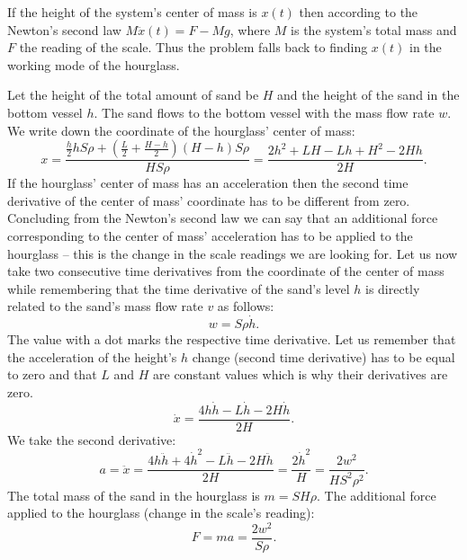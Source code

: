 {\ifEngHint
If the height of the system’s center of mass is $x(t)$ then according to the Newton’s second law $M\ddot{x}(t) = F - Mg$, where $M$ is the system’s total mass and $F$ the reading of the scale. Thus the problem falls back to finding $x(t)$ in the working mode of the hourglass.
\fi


\ifEngSolution
Let the height of the total amount of sand be $H$ and the height of the sand in the bottom vessel $h$. The sand flows to the bottom vessel with the mass flow rate $w$.\\
We write down the coordinate of the hourglass’ center of mass:
\[x=\frac{\frac{h}{2}hS\rho+(\frac{L}{2}+\frac{H-h}{2})(H-h)S\rho}{HS\rho}=\frac{2h^2+LH-Lh+H^2-2Hh}{2H}.\] 
If the hourglass’ center of mass has an acceleration then the second time derivative of the center of mass’ coordinate has to be different from zero. Concluding from the Newton’s second law we can say that an additional force corresponding to the center of mass’ acceleration has to be applied to the hourglass – this is the change in the scale readings we are looking for. Let us now take two consecutive time derivatives from the coordinate of the center of mass while remembering that the time derivative of the sand’s level $h$ is directly related to the sand’s mass flow rate $v$ as follows:
\[w=S\rho\dot{h}.\] 
The value with a dot marks the respective time derivative. Let us remember that the acceleration of the height’s $h$ change (second time derivative) has to be equal to zero and that $L$ and $H$ are constant values which is why their derivatives are zero.
\[\dot{x}=\frac{4h\dot{h}-L\dot{h}-2H\dot{h}}{2H}.\] 
We take the second derivative:
\[a=\ddot{x}=\frac{4h\ddot{h}+4\dot{h}^2-L\ddot{h}-2H\ddot{h}}{2H}=\frac{2\dot{h}^2}{H}=\frac{2w^2}{HS^2\rho^2}.\] 
The total mass of the sand in the hourglass is $m=SH\rho$. The additional force applied to the hourglass (change in the scale’s reading):
\[F=ma=\frac{2w^2}{S\rho}.\]
\fi
}